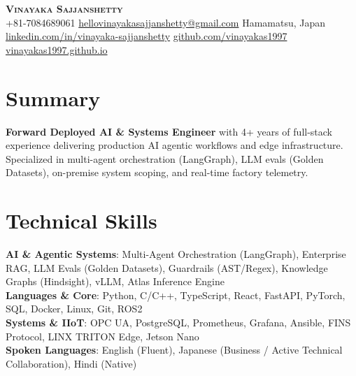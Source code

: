 \documentclass[letterpaper,10pt]{article}
\begin{document}
\begin{center}
    \textbf{\Huge \scshape Vinayaka Sajjanshetty} \\ \vspace{2pt}
    \small
    \faPhone \thinspace +81-7084689061 \quad
    \faEnvelope \thinspace \href{mailto:hellovinayakasajjanshetty@gmail.com}{hellovinayakasajjanshetty@gmail.com} \quad
    \faMapMarker \thinspace Hamamatsu, Japan \\ \vspace{1pt}
    \faLinkedin \thinspace \href{https://www.linkedin.com/in/vinayaka-sajjanshetty-91033111a}{linkedin.com/in/vinayaka-sajjanshetty} \quad
    \faGithub \thinspace \href{https://github.com/vinayakas1997}{github.com/vinayakas1997} \quad
    \faGlobe \thinspace \href{https://vinayakas1997.github.io/my-project-docs/}{vinayakas1997.github.io}
\end{center}


\section{Summary}
 \begin{itemize}[leftmargin=0.15in, label={}]
    \small{\item{
     \textbf{Forward Deployed AI \& Systems Engineer} with 4+ years of full-stack experience delivering production AI agentic workflows and edge infrastructure. Specialized in multi-agent orchestration (LangGraph), LLM evals (Golden Datasets), on-premise system scoping, and real-time factory telemetry.
    }}
 \end{itemize}


\section{Technical Skills}
 \begin{itemize}[leftmargin=0.15in, label={}]
    \small{\item{
     \textbf{AI \& Agentic Systems}{: Multi-Agent Orchestration (LangGraph), Enterprise RAG, LLM Evals (Golden Datasets), Guardrails (AST/Regex), Knowledge Graphs (Hindsight), vLLM, Atlas Inference Engine} \\
     \textbf{Languages \& Core}{: Python, C/C++, TypeScript, React, FastAPI, PyTorch, SQL, Docker, Linux, Git, ROS2} \\
     \textbf{Systems \& IIoT}{: OPC UA, PostgreSQL, Prometheus, Grafana, Ansible, FINS Protocol, LINX TRITON Edge, Jetson Nano} \\
     \textbf{Spoken Languages}{: English (Fluent), Japanese (Business / Active Technical Collaboration), Hindi (Native)}
    }}
 \end{itemize}
\end{document}
